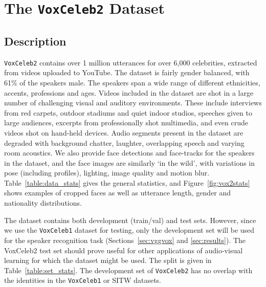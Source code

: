\documentclass[a4paper]{article}
\def\subsec{\vspace{-5pt}}
\begin{document}
\section{The {\tt VoxCeleb2} Dataset}
\label{sec:dataset}

\subsection{Description}
\subsec
{\tt VoxCeleb2} contains over 1 million utterances for over 6,000
celebrities, extracted from videos uploaded to YouTube. The dataset is
fairly gender balanced, with 61\% of the speakers male. The speakers span a
wide range of different ethnicities, accents, professions and ages. 
Videos included in the dataset are shot in a large number of challenging visual and auditory environments. These include interviews from red carpets, outdoor stadiums and quiet indoor studios, speeches given to large audiences, excerpts from professionally shot multimedia, and even crude videos shot on hand-held devices. Audio segments present in the dataset are degraded with background chatter, laughter, overlapping speech and varying room acoustics. 
We also provide face detections and face-tracks for the speakers in the dataset, and the face images are similarly `in the wild', with variations in pose (including profiles), lighting, image quality and motion blur.  Table~\ref{table:data_stats} gives the general statistics, and Figure~\ref{fig:vox2stats} shows examples of cropped faces as well as utterance length, gender and nationality distributions. 

The dataset contains both development (train/val) and test sets.
However, since we use the {\tt VoxCeleb1} dataset for testing,  
only the development set will be used for the speaker
recognition task (Sections~\ref{sec:vggvox} and \ref{sec:results}). The VoxCeleb2 test set
should prove useful for other applications of audio-visual learning
for which the dataset might be used. The split is given in
Table~\ref{table:set_stats}.  The development set of {\tt VoxCeleb2}
has no overlap with the identities in the {\tt VoxCeleb1} or SITW
datasets.
\end{document}
